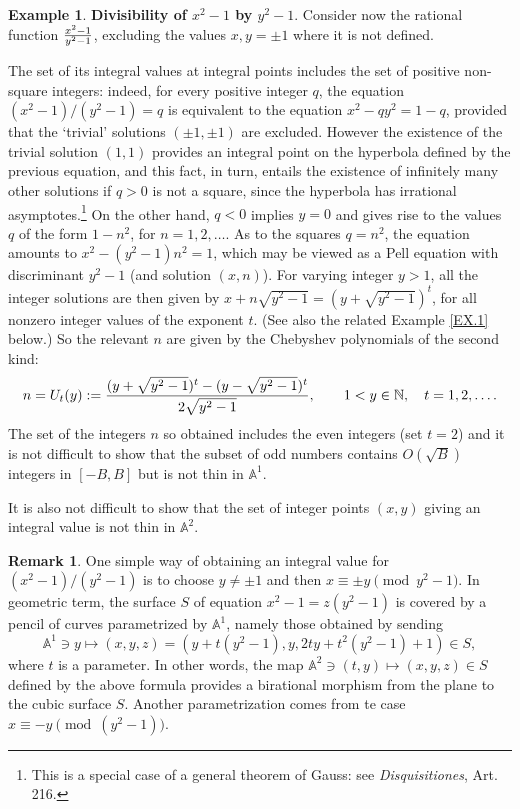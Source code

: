 \documentclass[leqno,12pt]{article} %
\def\N{{{\mathbb N}}}
\def\A{{{\mathbb A}}}
\theoremstyle{plain} %
\theoremstyle{definition} %
\newtheorem{remark}[theorem]{\indent\sc Remark}
\newtheorem{example}[theorem]{\indent\sc Example}
\begin{document}
\begin{example}\label{EX.0} {\bf Divisibility of $x^2-1$ by $y^2-1$}. Consider now the rational function $
{x^2-1\over y^2-1}$,  excluding the values $ x,y= \pm 1
$ where it is not defined.

 The set of its integral values at integral points includes  the set of positive non-square integers: indeed, for every positive integer $q$, the equation $(x^2-1)/(y^2-1)=q$ is equivalent to the  equation $x^2-qy^2=1-q$, provided that the `trivial' solutions $(\pm 1,\pm 1)$ %
are  excluded. However the existence of the trivial solution $(1,1)$ provides an integral point on the hyperbola  defined by the previous equation, and this fact, in turn, entails the existence of infinitely many other solutions if $q>0$ is not a square, since the   hyperbola  has irrational asymptotes.\footnote{This is a special case of a general theorem of Gauss: see {\it Disquisitiones}, Art. 216.}  On the other hand, $q<0$ implies $y= 0$  and gives rise to the values  $q$   of the form $1-n^2$, for $n=1,2,\ldots$.
  As to the squares $q=n^2$, the equation  amounts to  $x^2-(y^2-1)n^2=1$, which may be viewed as a Pell equation with discriminant $y^2-1$ (and solution $(x,n)$). For varying integer $y>1$, all the integer solutions are then given by $x+n\sqrt{y^2-1}=(y+\sqrt{y^2-1})^t$, for all nonzero integer values of the exponent $t$. (See also the related Example \ref{EX.1} below.) So the relevant $n$ are given by the Chebyshev polynomials of the second kind: 
  $$
  n=U_t(y):={(y+\sqrt{y^2-1})^t-(y-\sqrt{y^2-1})^t\over 2\sqrt{y^2-1}}, \qquad 1<y\in\N, \quad t=1,2,\ldots.
  $$
The set of the integers $n$  so obtained includes the even integers (set $t=2$) and  it is not difficult to show that  the subset of odd numbers contains $O(\sqrt B)$ integers in $[-B,B]$ but  is not thin in $\A^1$.

It is also not difficult to show that the set of integer points $(x,y)$ giving an integral value is not thin in $\A^2$.

\begin{remark}
One simple way of obtaining an integral value for $(x^2-1)/(y^2-1)$ is to choose $y\neq\pm 1$ and then $x\equiv \pm y \pmod{y^2-1}$. In geometric term, the surface $S$ of equation $x^2-1=z(y^2-1)$ is covered by a pencil of curves parametrized by $\A^1$, namely those obtained by sending
$$
\A^1 \ni y \mapsto (x,y,z)=(y+t(y^2-1),y,2ty+t^2(y^2-1)+1) \in S,
$$
where $t$ is a parameter.
In other words, the map $\A^2\ni(t,y)\mapsto (x,y,z)\in S$ defined by the above formula provides a birational morphism  from the plane to the cubic surface $S$.  Another parametrization comes from te case $x\equiv -y \pmod{(y^2-1)}$.


\end{remark}
\end{example}
\end{document}
